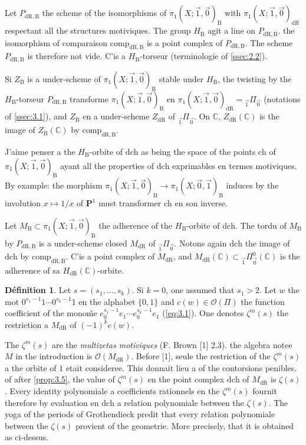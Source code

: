 \documentclass[11pt,a4paper]{article}
\theoremstyle{plain}
\theoremstyle{definition}
\newtheorem{definition}[theorem]{D\'efinition}
\newcommand{\C}{\mathbb{C}}
\newcommand{\dR}{\mathrm{dR}}
\newcommand{\B}{\mathrm{B}}
\newcommand{\comp}{\mathrm{comp}}
\begin{document}
\subsection{}\label{ssec:4.2}

Let $P_{\dR,\B}$ the scheme of the isomorphisms of $\pi_1(X;\vec{1},\vec{0})_{\B}$ with $\pi_1(X;\vec{1},\vec{0})_{\dR}$ respectant all the structures motiviques. The group $H_{\B}$ agit a line on $P_{\dR,\B}$. the isomorphism of comparaison $\comp_{\dR,\B}$ is a point complex of $P_{\dR,\B}$. The scheme $P_{\dR,\B}$ is therefore not vide. C'is a $H_{\B}$-torseur (terminologie of \ref{ssec:2.2}).

Si $Z_{\B}$ is a under-scheme of $\pi_1(X;\vec{1},\vec{0})_{\B}$ stable under $H_{\B}$, the twisting by the $H_{\B}$-torseur $P_{\dR,\B}$ transforme $\pi_1(X;\vec{1},\vec{0})_{\B}$ en $\pi_1(X;\vec{1},\vec{0})_{\dR} = {}_{\vec{1}}\Pi_{\vec{0}}$ (notations of \ref{ssec:3.1}), and $Z_{\B}$ en a under-scheme $Z_{\dR}$ of ${}_{\vec{1}}\Pi_{\vec{0}}$. On $\C$, $Z_{\dR}(\C)$ is the image of $Z_{\B}(\C)$ by $\comp_{\dR,\B}$.

J'aime penser a the $H_{\B}$-orbite of $\mathrm{dch}$ as being the space of the points $\mathrm{ch}$ of $\pi_1(X;\vec{1},\vec{0})_{\B}$ ayant all the properties of $\mathrm{dch}$ exprimables en termes motiviques. By example: the morphism $\pi_1(X;\vec{1},\vec{0})_{\B} \to \pi_1(X;\vec{0},\vec{1})_{\B}$ induces by the involution $x \mapsto 1/x$ of $\mathbf{P}^1$ must transformer $\mathrm{ch}$ en son inverse.

Let $M_{\B} \subset \pi_1(X;\vec{1},\vec{0})_{\B}$ the adherence of the $H_{\B}$-orbite of $\mathrm{dch}$. The tordu of $M_{\B}$ by $P_{\dR,\B}$ is a under-scheme closed $M_{\dR}$ of ${}_{\vec{1}}\Pi_{\vec{0}}$. Notons again $\mathrm{dch}$ the image of $\mathrm{dch}$ by $\comp_{\dR,\B}$. C'is a point complex of $M_{\dR}$, and $M_{\dR}(\C) \subset {}_{\vec{1}}\Pi^0_{\vec{0}}(\C)$ is the adherence of sa $H_{\dR}(\C)$-orbite.

\begin{definition}\label{def:4.3}
Let $s = (s_1,\ldots,s_k)$. Si $k = 0$, one assumed that $s_1 > 2$. Let $w$ the mot $0^{s_1-1} 1 \cdots 0^{s_k-1} 1$ en the alphabet $\{0,1\}$ and $c(w) \in \mathcal{O}(\Pi)$ the function coefficient of the mono\^me $e_0^{s_1-1} e_1 \cdots e_0^{s_k-1} e_1$ (\ref{eq:3.1}). One denotes $\zeta^m(s)$ the restriction a $M_{\dR}$ of $(-1)^k c(w)$.
\end{definition}

The $\zeta^m(s)$ are the \emph{multizetas motiviques} (F. Brown [1] 2.3). the algebra notee $M$ in the introduction is $\mathcal{O}(M_{\dR})$. Before [1], seule the restriction of the $\zeta^m(s)$ a the orbite of $1$ etait consideree. This donnait lieu a of the contorsions penibles. of after \ref{prop:3.5}, the value of $\zeta^m(s)$ en the point complex $\mathrm{dch}$ of $M_{\dR}$ is $\zeta(s)$. Every identity polynomiale a coefficients rationnels en the $\zeta^m(s)$ fournit therefore by evaluation en $\mathrm{dch}$ a relation polynomiale between the $\zeta(s)$. The yoga of the periods of Grothendieck predit that every relation polynomiale between the $\zeta(s)$ provient of the geometrie. More precisely, that it is obtained as ci-dessus.
\end{document}
